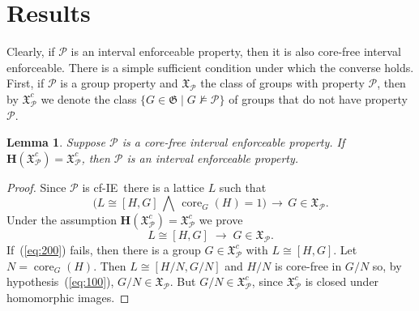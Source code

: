 \documentclass[11pt]{amsart}
\theoremstyle{plain}
\newtheorem{lemma}[theorem]{Lemma}
\theoremstyle{definition}
\theoremstyle{remark}
\numberwithin{theorem}{section}
\numberwithin{claim}{section}
\numberwithin{equation}{section}
\numberwithin{conjecture}{section}
\newcommand{\<}{\ensuremath{\langle}}
\renewcommand{\>}{\ensuremath{\rangle}}
\newcommand{\Meet}{\ensuremath{\bigwedge}}
\newcommand{\core}{\ensuremath{\operatorname{core}}}
\newcommand{\0}{\ensuremath{\mathbf{0}}}
\newcommand{\1}{\ensuremath{\mathbf{1}}}
\newcommand{\2}{\ensuremath{\mathbf{2}}}
\newcommand{\3}{\ensuremath{\mathbf{3}}}
\newcommand{\4}{\ensuremath{\mathbf{4}}}
\newcommand{\5}{\ensuremath{\mathbf{5}}}
\newcommand{\sG}{\ensuremath{\mathfrak{X}}}
\newcommand{\G}{\ensuremath{\mathfrak{G}}}
\newcommand{\bH}{\ensuremath{\mathbf{H}}}
\newcommand{\cP}{\ensuremath{\mathcal{P}}}
\newcommand{\IE}{{\small IE}}
\begin{document}
\section{Results}
Clearly, if $\cP$ is an interval enforceable property, then it is also
core-free interval enforceable.  There is a simple
sufficient condition under which the converse holds.  
First, if $\cP$ is a group property and $\sG_{\cP}$ the
class of groups with property $\cP$, then by $\sG_{\cP}^c$ we denote the class
$\{G\in \G \mid G\nvDash \cP\}$ 
of groups that do not have property $\cP$.
\begin{lemma}
\label{lemma-wjd-2}
Suppose $\cP$ is a core-free interval enforceable property.  
If $\bH(\sG_{\cP}^c) = \sG_{\cP}^c$, then $\cP$ is an interval enforceable property.
\end{lemma}
\begin{proof}
Since $\cP$ is cf-\IE\ there is a lattice $L$ such that
\begin{equation}
  \label{eq:100}
\bigl(L \cong [H,G] \, \Meet \, \core_G(H)=1\bigr) \, \longrightarrow \, G\in \sG_\cP.
\end{equation}
Under the assumption $\bH(\sG_\cP^c) = \sG_\cP^c$ we prove
\begin{equation}
  \label{eq:200}
L \cong [H,G] \; \longrightarrow \; G\in \sG_\cP.
\end{equation}
If~(\ref{eq:200}) fails, then there is a
group $G\in \sG_{\cP}^c$ with $L\cong [H,G]$.  Let $N = \core_G(H)$.  Then $L \cong
[H/N,G/N]$ and $H/N$ is core-free in $G/N$ so, by hypothesis~(\ref{eq:100}),
$G/N \in \sG_\cP$.  But $G/N \in \sG_{\cP}^c$, since $\sG_{\cP}^c$ is closed under homomorphic images.
\end{proof}
\end{document}
